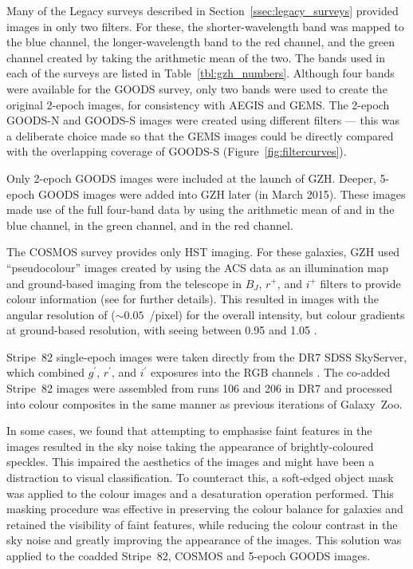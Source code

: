 \documentclass[a4paper,fleqn,usenatbib]{mnras}
\begin{document}
Many of the Legacy surveys described in Section~\ref{ssec:legacy_surveys}
provided \hst{} images in only two filters. For these, the shorter-wavelength band was
mapped to the blue channel, the longer-wavelength band to the red channel, and
the green channel created by taking the arithmetic mean of the two. The bands
used in each of the surveys are listed in Table~\ref{tbl:gzh_numbers}.
Although four bands were available for the GOODS survey, only two bands were
used to create the original 2-epoch images, for consistency with AEGIS and
GEMS. The 2-epoch GOODS-N and GOODS-S images were created using different
filters --- this was a deliberate choice made so that the GEMS images could be
directly compared with the overlapping coverage of GOODS-S
(Figure~\ref{fig:filtercurves}).

Only 2-epoch GOODS images were included at the launch of GZH.  Deeper, 5-epoch 
GOODS images were added into GZH later (in March 2015). These images made
use of the full four-band data by using the arithmetic mean of \Bband{} and
\Vband{} in the blue channel, \Iband{} in the green channel, and \zband{} in
the red channel.

The COSMOS survey provides only \Iband{} HST imaging. For these galaxies, GZH
used ``pseudocolour'' images created by using the ACS \Iband{} data as an
illumination map and ground-based imaging from the \subaru{} telescope in
$B_J$, $r^+$, and $i^+$ filters to provide colour information (see
\citealt{gri12} for further details). This resulted in images with the angular
resolution of \hst{} ($\sim0.05$~\arcsec/pixel) for the overall intensity, but
colour gradients at ground-based resolution, with seeing between 0.95\arcsec{}
and 1.05\arcsec{} \citep{tan07}.

Stripe~82 single-epoch images were taken directly from the DR7 SDSS SkyServer,
which combined $g^{\prime}$, $r^{\prime}$, and $i^{\prime}$ exposures into the
RGB channels \citep{nie04}. The co-added Stripe~82 images were assembled from runs 106 and
206 in DR7 and processed into colour composites in the same manner as previous
iterations of Galaxy~Zoo.

In some cases, we found that attempting to emphasise faint features in the
images resulted in the sky noise taking the appearance of brightly-coloured
speckles. This impaired the aesthetics of the images and might have been a
distraction to visual classification.  To counteract this, a soft-edged object
mask was applied to the colour images and a desaturation operation performed.
This masking procedure was effective in preserving the colour balance for
galaxies and retained the visibility of faint features, while reducing the colour
contrast in the sky noise and greatly improving the appearance of the images.
This solution was applied to the coadded Stripe~82, COSMOS and 5-epoch GOODS
images.
\end{document}
